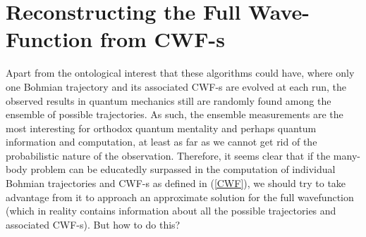 \documentclass[11pt, a4paper]{article} %
\begin{document}













\newpage
\section{Reconstructing the Full Wave-Function from CWF-s}
Apart from the ontological interest that these algorithms could have, where only one Bohmian trajectory and its associated CWF-s are evolved at each run, the observed results in quantum mechanics still are randomly found among the ensemble of possible trajectories. As such, the ensemble measurements are the most interesting for orthodox quantum mentality and perhaps quantum information and computation, at least as far as we cannot get rid of the probabilistic nature of the observation. Therefore, it seems clear that if the many-body problem can be educatedly surpassed in the computation of individual Bohmian trajectories and CWF-s as defined in (\ref{CWF}), we should try to take advantage from it to approach an approximate solution for the full wavefunction (which in reality contains information about all the possible trajectories and associated CWF-s). But how to do this?
\end{document}
